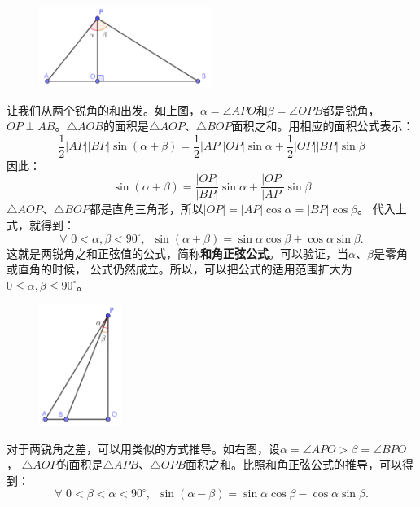 \documentclass[12pt,UTF8]{ctexbook}
\begin{document}
\begin{figure}[H] %
    \vspace{4pt}
    \centering
    \includegraphics[width=0.5\textwidth]{和角正弦公式1.png}
\end{figure}

让我们从两个锐角的和出发。如上图，$\alpha = \angle APO$和$\beta = \angle OPB$都是锐角，
$OP \perp AB$。$\triangle AOB$的面积是$\triangle AOP$、$\triangle BOP$面积之和。用相应的面积公式表示：
$$ \frac12 |AP||BP|\sin(\alpha + \beta) = \frac12 |AP||OP|\sin\alpha + \frac12 |OP||BP|\sin\beta$$
因此：
$$ \sin(\alpha + \beta) = \frac{|OP|}{|BP|}\sin\alpha + \frac{|OP|}{|AP|}\sin\beta$$
$\triangle AOP$、$\triangle BOP$都是直角三角形，所以$|OP| = |AP|\cos \alpha = |BP|\cos \beta$。
代入上式，就得到：
$$ \forall \,\, 0 < \alpha, \beta < 90^\circ , \,\,\, \sin(\alpha + \beta) = \sin\alpha \cos \beta + \cos \alpha \sin\beta.$$
这就是两锐角之和正弦值的公式，简称\textbf{和角正弦公式}。可以验证，当$\alpha$、$\beta$是零角或直角的时候，
公式仍然成立。所以，可以把公式的适用范围扩大为$0 \leqslant \alpha , \beta \leqslant 90^\circ$。

\begin{figure} %
    \vspace{-45pt}
    \flushright
    \includegraphics[width=0.24\textwidth]{差角正弦公式1.png}
\end{figure}

对于两锐角之差，可以用类似的方式推导。如右图，设$\alpha = \angle APO > \beta = \angle BPO$，
$\triangle AOP$的面积是$\triangle APB$、$\triangle OPB$面积之和。比照和角正弦公式的推导，可以得到：
$$ \forall \,\, 0 <  \beta < \alpha < 90^\circ , \,\,\, \sin(\alpha - \beta) = \sin\alpha \cos \beta - \cos \alpha \sin\beta.$$
\end{document}
